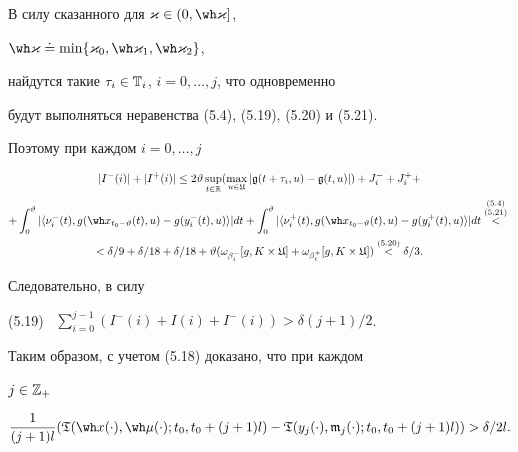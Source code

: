 В силу сказанного для $\varkappa\in(0,\wh\varkappa]$,


$\wh\varkappa\doteq\min\{\varkappa_0,\wh\varkappa_1,


\wh\varkappa_2\}$,


найдутся такие $\tau_i\in\Bbb T_i$, $i=0,\dotsc,j$, что одновременно


будут выполняться неравенства (5.4), (5.19), (5.20) и (5.21).


Поэтому при каждом $i=0,\dotsc,j$


\begin{gather*}


|I^-(i)|+|I^+(i)|\le2\vartheta \sup_{t\in\bR}


(\max_{u\in\frak U}|\frak g(t+\tau_i,u)


-\frak g(t,u)|)+J_i^-+J_i^+ + \\


%


+\int_0^\vartheta|\langle\nu_i^-(t),


g(\wh x_{t_0-\vartheta}(t),u)-


g(y_i^-(t),u)\rangle|dt


+\int_0^\vartheta|\langle\nu_i^+(t),g(\wh x_{t_0-\vartheta}(t),u)-


g(y_{i}^{+}(t),u)\rangle | dt 


\overset{ \overset{\scriptstyle{(5.4)}}{(5.21)}{} } {<} {} \\


%


<\delta/9+\delta/18+\delta/18


+\vartheta(\omega_{\beta_i^-}[g,K\times\frak U]+


\omega_{\beta_i^+}[g,K\times{\frak


U}])\up{(5.20)}{<}\delta/3.


\end{gather*}


Следовательно, в силу


(5.19) \ $\sum\limits_{i=0}^{j-1}(I^-(i)+I(i)+I^-(i))>\delta(j+1)/2$.





Таким образом, с учетом (5.18) доказано, что при каждом


$j\in\Bbb Z_+$


\begin{equation}


\frac{1}{(j+1)l}(\frak T


(\wh x(\cdot),\wh\mu(\cdot);t_0,t_0+(j+1)l)-


\frak T(y_{j}(\cdot),\frak m_j(\cdot);t_0,t_0+(j+1)l))>\delta/2l.


\end{equation}





